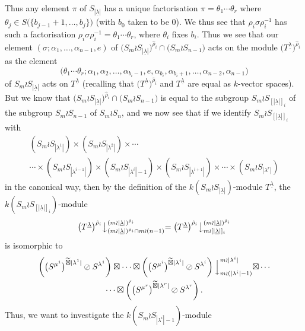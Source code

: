 \documentclass[ALCO,Unicode,published]{cedram}
\newcommand{\ul}[1]{\underline{#1}}
\begin{document}
Thus any element $\pi$ of $S_{|\ul{\lambda}|}$ has a unique factorisation $\pi = \theta_1\cdots\theta_r$ where
$\theta_j \in S\bigl(\{b_{j-1}+1,\ldots,b_j\}\bigr)$ (with $b_0$ taken to be 0). We thus see that $\rho_i\sigma\rho_i^{-1}$ has such a
factorisation $\rho_i\sigma\rho_i^{-1} = \theta_1\cdots\theta_r$, where $\theta_i$ fixes $b_i$. 
Thus we see that our element
$(\sigma;\alpha_1,\ldots,\alpha_{n-1},e)$ of $\bigl(S_m \wr S_{|\ul{\lambda}|}\bigr)^{\hat\rho_i}\cap\bigl(S_m \wr S_{n-1}\bigr)$ acts on the
module $\bigl(T^{\ul{\lambda}}\bigr)^{\hat\rho_i}$ as the element
\[
\bigl(\theta_1\cdots\theta_r;\alpha_1,\alpha_2,\ldots,\alpha_{b_i-1},e,\alpha_{b_i},\alpha_{b_i+1},\ldots,\alpha_{n-2},\alpha_{n-1}\bigr)
\]
of $S_m \wr S_{|\ul{\lambda}|}$ acts on $T^{\ul{\lambda}}$ (recalling that $\bigl(T^{\ul{\lambda}}\bigr)^{\hat\rho_i}$ and $T^{\ul{\lambda}}$ are equal
as $k$-vector spaces). But we know that $\bigl(S_m \wr S_{|\ul{\lambda}|}\bigr)^{\hat\rho_i}\cap\bigl(S_m \wr S_{n-1}\bigr)$ is equal to the
subgroup $S_m \wr S_{[|\ul{\lambda}|]_i}$ of the subgroup $S_m \wr S_{n-1}$ of $S_m \wr S_n$, and we now see that if we identify
$S_m \wr S_{[|\ul{\lambda}|]_i}$ with
\begin{multline*}
(S_m \wr S_{|\lambda^1|})\times(S_m \wr S_{|\lambda^2|})\times\cdots\\
\cdots\times
(S_m \wr S_{|\lambda^{i-1}|})\times(S_m \wr S_{|\lambda^i|-1})\times(S_m \wr S_{|\lambda^{i+1}|})\times\cdots\times
(S_m \wr S_{|\lambda^r|})
\end{multline*}
in the canonical way, then by the definition of the $k(S_m \wr S_{|\ul{\lambda}|})$-module $T^{\ul{\lambda}}$, the
$k(S_m \wr S_{[|\ul{\lambda}|]_i})$-module
\[
\bigl(T^{\ul{\lambda}}\bigr)^{\hat\rho_i}\bigl\downarrow^{(m{\wr}|\ul{\lambda}|)^{\hat\rho_i}}_{(m{\wr}|\ul{\lambda}|)^{\hat\rho_i} \cap m \wr (n-1)}
=
\bigl(T^{\ul{\lambda}}\bigr)^{\hat\rho_i}\bigl\downarrow^{(m{\wr}|\ul{\lambda}|)^{\hat\rho_i}}_{m \wr [|\ul{\lambda}|]_i}
\]
is isomorphic to
\begin{multline}\label{T_ul_lambd_isom_in_place_res:eq}
\left(\bigl(S^{\mu^1}\bigr)^{\widetilde\boxtimes |\lambda^1|}\oslash S^{\lambda^1}\right)\boxtimes\cdots\boxtimes
\left(\bigl(S^{\mu^i}\bigr)^{\widetilde\boxtimes |\lambda^i|}\oslash S^{\lambda^i}\right)\Bigl\downarrow^{m \wr |\lambda^i|}_{m \wr (|\lambda^i|-1)}
\boxtimes\cdots\\
\cdots\boxtimes
\left(\bigl(S^{\mu^r}\bigr)^{\widetilde\boxtimes |\lambda^r|}\oslash S^{\lambda^r}\right).
\end{multline}
Thus, we want to investigate the $k(S_m \wr S_{|\lambda^i|-1})$-module
\end{document}
